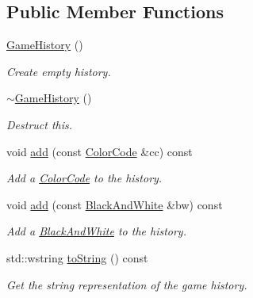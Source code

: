 \subsection*{Public Member Functions}
\begin{DoxyCompactItemize}
\item 
\hyperlink{classmastermind_1_1logic_1_1_game_history_a4731c4c94790c94c5f5e72a5ef344602}{Game\+History} ()
\begin{DoxyCompactList}\small\item\em Create empty history. \end{DoxyCompactList}\item 
\hyperlink{classmastermind_1_1logic_1_1_game_history_a7f94763f41492e795201f000874ba9e1}{$\sim$\+Game\+History} ()
\begin{DoxyCompactList}\small\item\em Destruct this. \end{DoxyCompactList}\item 
void \hyperlink{classmastermind_1_1logic_1_1_game_history_abcf47c78a6e9be8faa4238f2bc45e5e7}{add} (const \hyperlink{classmastermind_1_1logic_1_1_color_code}{Color\+Code} \&cc) const
\begin{DoxyCompactList}\small\item\em Add a \hyperlink{classmastermind_1_1logic_1_1_color_code}{Color\+Code} to the history. \end{DoxyCompactList}\item 
void \hyperlink{classmastermind_1_1logic_1_1_game_history_a0d81e90269bca2588b857c1c8bf966b8}{add} (const \hyperlink{classmastermind_1_1logic_1_1_black_and_white}{Black\+And\+White} \&bw) const
\begin{DoxyCompactList}\small\item\em Add a \hyperlink{classmastermind_1_1logic_1_1_black_and_white}{Black\+And\+White} to the history. \end{DoxyCompactList}\item 
std\+::wstring \hyperlink{classmastermind_1_1logic_1_1_game_history_ae3795a9ab89a850bc3b1f36d3ba76756}{to\+String} () const
\begin{DoxyCompactList}\small\item\em Get the string representation of the game history. \end{DoxyCompactList}\end{DoxyCompactItemize}
